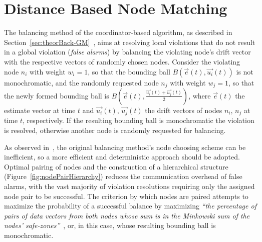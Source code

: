 \section{Distance Based Node Matching} \label{sec:impl-distNodeMatch}

The balancing method of the coordinator-based algorithm, as described in Section~\ref{sec:theorBack-GM}~\cite{Sharfman2006GM, Sharfman2008ShapeSensGM}, aims at resolving local violations that do not result in a global violation (\emph{false alarms}) by balancing the violating node's drift vector with the respective vectors of randomly chosen nodes. Consider the violating node $n_i$ with weight $w_i=1$, so that the bounding ball $B(\vec{e}(t), \vec{u_i}(t))$ is not monochromatic, and the randomly requested node $n_j$ with weight $w_j=1$, so that the newly formed bounding ball is $B(\vec{e}(t), \frac{\vec{u_i}(t)+\vec{u_j}(t)}{2})$, where $\vec{e}(t)$ the estimate vector at time $t$ and $\vec{u_i}(t)$, $\vec{u_j}(t)$ the drift vectors of nodes $n_i$, $n_j$ at time $t$, respectively. If the resulting bounding ball is monochromatic the violation is resolved, otherwise another node is randomly requested for balancing.

As observed in~\cite{Keren2014GMHetStreams}, the original balancing method's node choosing scheme can be inefficient, so a more efficient and deterministic approach should be adopted. Optimal pairing of nodes and the construction of a hierarchical structure (Figure~\ref{fig:nodePairHierarchy}) reduces the communication overhead of false alarms, with the vast majority of violation resolutions requiring only the assigned node pair to be successful. The criterion by which nodes are paired attempts to maximize the probability of a successful balance by maximizing \textit{``the percentage of pairs of data vectors from both nodes whose sum is in the Minkowski sum of the nodes' safe-zones''}~\cite{Keren2014GMHetStreams}, or, in this case, whose resulting bounding ball is monochromatic.

